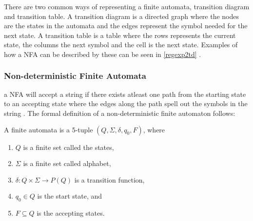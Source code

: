 There are two common ways of representing a finite automata, transition diagram
and transition table. A transition diagram is a directed graph where the nodes
are the states in the automata and the edges represent the symbol needed for the
next state. A transition table is a table where the rows represents the current
state, the columns the next symbol and the cell is the next state. Examples of
how a NFA can be described by these can be seen in \cref{regexp2td}
\cite{Aho2006}.

\subsubsection{Non-deterministic Finite Automata}
a NFA will accept a string if there exists atleast one path from the starting
state to an accepting state where the edges along the path spell out the symbols
in the string \cite{Aho2006}.
The formal definition of a non-deterministic finite automaton follows:
\newpage
\begin{definition} \label{finiteAutomataDef}
A finite automata is a 5-tuple $(Q, \Sigma, \delta, q_0, F)$, where
\begin{enumerate}
  \item $Q$ is a finite set called the states,
  \item $\Sigma$ is a finite set called alphabet,
  \item $\delta: Q \times \Sigma \to P(Q)$ is a transition function,
  \item $q_0 \in Q$ is the start state, and
  \item $F \subseteq Q$ is the accepting states.
\end{enumerate} 
\end{definition}

